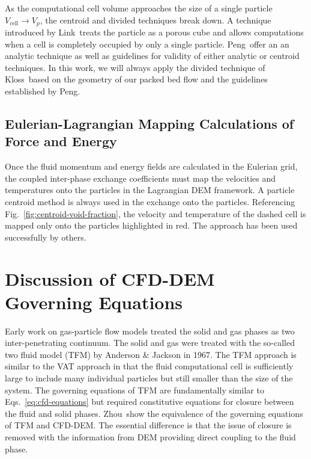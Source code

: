 As the computational cell volume approaches the size of a single particle $V_\text{cell}\rightarrow V_p$, the centroid and divided techniques break down. A technique introduced by Link\etal~treats the particle as a porous cube and allows computations when a cell is completely occupied by only a single particle.\cite{Link2005} Peng\etal~offer an an analytic technique as well as guidelines for validity of either analytic or centroid techniques.\cite{Peng2014} In this work, we will always apply the divided technique of Kloss\etal~based on the geometry of our packed bed flow and the guidelines established by Peng\etal.\cite{Kloss2012,Peng2014}


\subsection{Eulerian-Lagrangian Mapping Calculations of Force and Energy}
Once the fluid momentum and energy fields are calculated in the Eulerian grid, the coupled inter-phase exchange coefficients must map the velocities and temperatures onto the particles in the Lagrangian DEM framework. A particle centroid method is always used in the exchange onto the particles. Referencing Fig.~\ref{fig:centroid-void-fraction}, the velocity and temperature of the dashed cell is mapped only onto the particles highlighted in red. The approach has been used successfully by others.\cite{Xu1997,Link2005,Kloss2012}







\section{Discussion of CFD-DEM Governing Equations}
Early work on gas-particle flow models treated the solid and gas phases as two inter-penetrating continuum. The solid and gas were treated with the so-called two fluid model (TFM) by Anderson \& Jackson in 1967.\cite{Anderson1967} The TFM approach is similar to the VAT approach in that the fluid computational cell is sufficiently large to include many individual particles but still smaller than the size of the system.\cite{Enwald1996} The governing equations of TFM are fundamentally similar to Eqs.~\ref{eq:cfd-equations} but required constitutive equations for closure between the fluid and solid phases. Zhou\etal~show the equivalence of the governing equations of TFM and CFD-DEM.\cite{Zhou2010} The essential difference is that the issue of closure is removed with the information from DEM providing direct coupling to the fluid phase.


